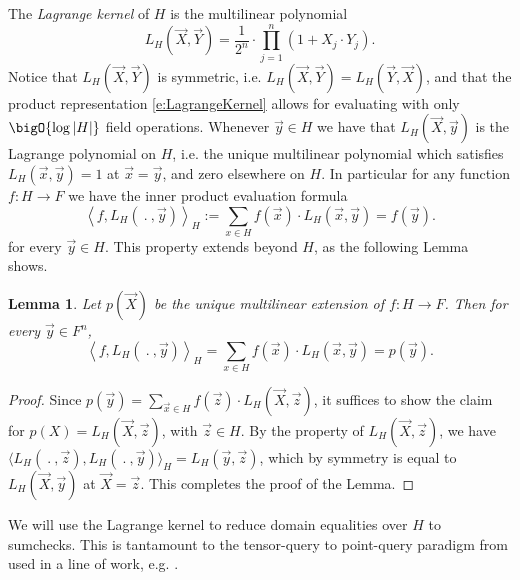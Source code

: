 \documentclass[11pt]{article}
\newtheorem{lem}[]{Lemma}
\theoremstyle{definition}
\theoremstyle{remark}
\begin{document}
The \textit{Lagrange kernel} of $H$ is the multilinear polynomial
\begin{equation}
\label{e:LagrangeKernel}
L_H(\vec X, \vec Y)  = \frac{1}{2^n}\cdot \prod_{j=1}^n (1 + X_j\cdot Y_j).
\end{equation}
Notice that $L_H(\vec X, \vec Y)$ is symmetric, i.e. $L_H(\vec X, \vec Y)=L_H(\vec Y, \vec X)$, and that the product representation \eqref{e:LagrangeKernel} allows for evaluating with only $\bigO{\log|H|}$ field operations.
Whenever $\vec y \in H$ we have that $L_H(\vec X, \vec y)$ is the Lagrange polynomial on $H$, i.e. the unique multilinear polynomial which satisfies $L_H(\vec x, \vec y) = 1$ at $\vec x = \vec y$, and zero elsewhere on $H$.
In particular for any function $f: H\longrightarrow F$  we have the inner product evaluation formula 
\[
\left\langle f ,L_H(\:.\:, \vec y)\right\rangle_H := \sum_{x\in H} f(\vec x) \cdot L_H(\vec x, \vec y) = f(\vec y).
\]
for every  $\vec y\in H$.
This property extends beyond $H$, as the following Lemma shows.
\begin{lem}
\label{lem:Lagrange}
Let $p(\vec X)$ be the unique multilinear extension of $f: H\rightarrow F$. 
Then for every $\vec y\in F^n$,
\begin{equation}
\label{e:LagrangeScalarProduct}
\left\langle f ,L_H(\:.\:, \vec y)\right\rangle_H = \sum_{x\in H} f(\vec x) \cdot L_H(\vec x, \vec y) = p(\vec y).
\end{equation}
\end{lem}
\begin{proof}
Since $p(\vec y) = \sum_{\vec x\in H} f(\vec z)\cdot L_H(\vec X,\vec z)$, it suffices to show the claim for $p(X) = L_H(\vec X,\vec z)$, with $\vec z\in H$.
By the property of $L_H(\vec X,\vec z)$, we have $\big\langle L_H(\:.\:, \vec z), L_H(\:.\:,\vec y) \big\rangle_H =L_H(\vec y,\vec z)$, which by symmetry is equal to $L_H(\vec X,\vec y)$ at $\vec X=\vec z$.
This completes the proof of the Lemma.
\end{proof}

We will use the Lagrange kernel to reduce domain equalities over $H$ to sumchecks. 
This is tantamount to the tensor-query to point-query paradigm from \cite{TensorIOP} used in a line of work, e.g. \cite{TensorCodes, TensorR1CS, TensorRothblum, TensorR1CSarbitraryF}.
\end{document}
